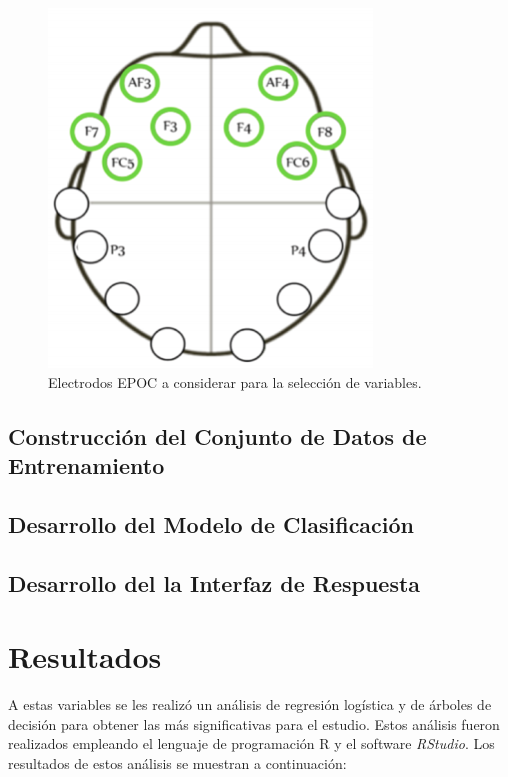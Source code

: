\begin{figure}
    \centering
    \includegraphics[scale=1]{figuras/Imagen2.png}
    \caption{Electrodos EPOC a considerar para la selección de variables.}
    \label{fig:my_label}
\end{figure}




\section{Construcción del Conjunto de Datos de Entrenamiento}
\section{Desarrollo del Modelo de Clasificación}
\section{Desarrollo del la Interfaz de Respuesta}



\chapter{Resultados}
A estas variables se les realizó un análisis de regresión logística y de árboles de decisión para obtener las más significativas para el estudio. Estos análisis fueron realizados empleando el lenguaje de programación R y el software \textit{RStudio}. Los resultados de estos análisis se muestran a continuación:

